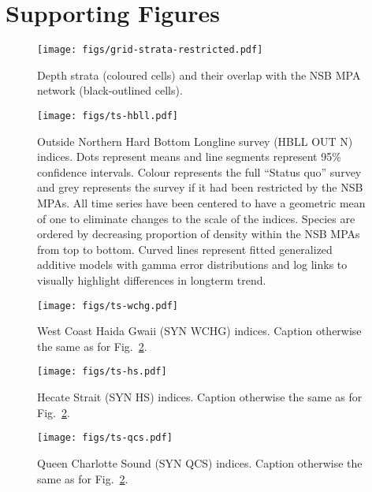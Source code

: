 \documentclass[12pt]{article}
\begin{document}
\clearpage

\section*{Supporting Figures}

\begin{figure}[htb]
    \centering
    \texttt{[image: figs/grid-strata-restricted.pdf]}
    \caption{Depth strata (coloured cells) and their overlap with the NSB MPA network (black-outlined cells).}
    \label{fig:strata}
\end{figure}

\clearpage

\begin{figure}[htb]
    \centering
    \texttt{[image: figs/ts-hbll.pdf]}
    \caption{Outside Northern Hard Bottom Longline survey (HBLL OUT N) indices. Dots represent means and line segments represent 95\% confidence intervals. Colour represents the full ``Status quo'' survey and grey represents the survey if it had been restricted by the NSB MPAs. All time series have been centered to have a geometric mean of one to eliminate changes to the scale of the indices. Species are ordered by decreasing proportion of density within the NSB MPAs from top to bottom. Curved lines represent fitted generalized additive models with gamma error distributions and log links to visually highlight differences in longterm trend.}
    \label{fig:ts-hbll}
\end{figure}

\clearpage

\begin{figure}[htb]
    \centering
    \texttt{[image: figs/ts-wchg.pdf]}
    \caption{West Coast Haida Gwaii (SYN WCHG) indices. Caption otherwise the same as for
    Fig.~\ref{fig:ts-hbll}.}
    \label{fig:ts-wchg}
\end{figure}

\clearpage

\begin{figure}[htb]
    \centering
    \texttt{[image: figs/ts-hs.pdf]}
    \caption{Hecate
      Strait (SYN HS) indices. Caption otherwise the same as for Fig.~\ref{fig:ts-hbll}.}
    \label{fig:ts-hs}
\end{figure}

\clearpage

\begin{figure}[htb]
    \centering
    \texttt{[image: figs/ts-qcs.pdf]}
    \caption{Queen Charlotte Sound (SYN QCS) indices. Caption otherwise the same as for Fig.~\ref{fig:ts-hbll}.}
    \label{fig:ts-qcs}
\end{figure}
\end{document}
